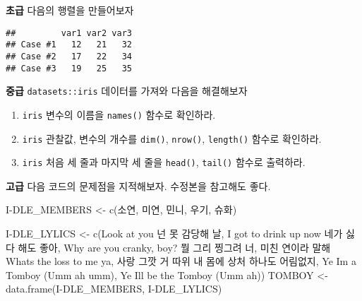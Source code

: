 \documentclass[
  12,
]{article}
\newenvironment{Shaded}{\begin{snugshade}}{\end{snugshade}}
\newcommand{\FunctionTok}[1]{\textcolor[rgb]{0.00,0.00,0.00}{#1}}
\newcommand{\NormalTok}[1]{#1}
\newcommand{\OtherTok}[1]{\textcolor[rgb]{0.56,0.35,0.01}{#1}}
\newcommand{\SpecialCharTok}[1]{\textcolor[rgb]{0.00,0.00,0.00}{#1}}
\newcommand{\StringTok}[1]{\textcolor[rgb]{0.31,0.60,0.02}{#1}}
\begin{document}
\textbf{초급} 다음의 행렬을 만들어보자

\begin{verbatim}
##         var1 var2 var3
## Case #1   12   21   32
## Case #2   17   22   34
## Case #3   19   25   35
\end{verbatim}

\textbf{중급} \texttt{datasets::iris} 데이터를 가져와 다음을 해결해보자

\begin{enumerate}
\def\labelenumi{\arabic{enumi})}
\item
  \texttt{iris} 변수의 이름을 \texttt{names()} 함수로 확인하라.
\item
  \texttt{iris} 관찰값, 변수의 개수를 \texttt{dim()}, \texttt{nrow()},
  \texttt{length()} 함수로 확인하라.
\item
  \texttt{iris} 처음 세 줄과 마지막 세 줄을 \texttt{head()},
  \texttt{tail()} 함수로 출력하라.
\end{enumerate}

\textbf{고급} 다음 코드의 문제점을 지적해보자. 수정본을 참고해도 좋다.

\begin{Shaded}
\begin{Highlighting}[]
\NormalTok{I}\SpecialCharTok{{-}}\NormalTok{DLE\_MEMBERS }\OtherTok{\textless{}{-}} \FunctionTok{c}\NormalTok{(}\StringTok{\textquotesingle{}소연\textquotesingle{}}\NormalTok{, }\StringTok{\textquotesingle{}미연\textquotesingle{}}\NormalTok{, }\StringTok{\textquotesingle{}민니\textquotesingle{}}\NormalTok{, }\StringTok{\textquotesingle{}우기\textquotesingle{}}\NormalTok{, }\StringTok{\textquotesingle{}슈화\textquotesingle{}}\NormalTok{)}

\NormalTok{I}\SpecialCharTok{{-}}\NormalTok{DLE\_LYLICS }\OtherTok{\textless{}{-}} \FunctionTok{c}\NormalTok{(}\StringTok{\textquotesingle{}Look at you 넌 못 감당해 날\textquotesingle{}}\NormalTok{, }
                  \StringTok{\textquotesingle{}I got to drink up now 네가 싫다 해도 좋아\textquotesingle{}}\NormalTok{, }
                  \StringTok{\textquotesingle{}Why are you cranky, boy? 뭘 그리 찡그려 너\textquotesingle{}}\NormalTok{, }
                  \StringTok{\textquotesingle{}미친 연이라 말해 What\textquotesingle{}}\NormalTok{s the loss to me ya}\StringTok{\textquotesingle{}, }
\StringTok{                  \textquotesingle{}}\NormalTok{사랑 그깟 거 따위 내 몸에 상처 하나도 어림없지}\StringTok{\textquotesingle{}, }
\StringTok{                  \textquotesingle{}}\NormalTok{Ye I}\StringTok{\textquotesingle{}m a Tomboy (Umm ah umm)\textquotesingle{}}\NormalTok{, }
                  \StringTok{\textquotesingle{}Ye I\textquotesingle{}}\NormalTok{ll be the }\FunctionTok{Tomboy}\NormalTok{ (Umm ah)}\StringTok{\textquotesingle{})}
\StringTok{                  }
\StringTok{TOMBOY \textless{}{-} data.frame(I{-}DLE\_MEMBERS, I{-}DLE\_LYLICS)}
\end{Highlighting}
\end{Shaded}
\end{document}

